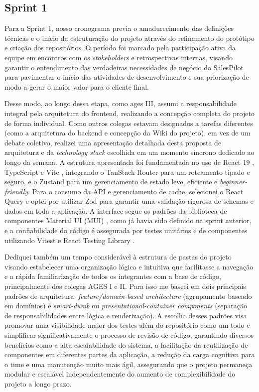 \subsection{Sprint 1}


Para a Sprint 1, nosso cronograma previa o amadurecimento das definições técnicas e o início da estruturação do projeto através do refinamento do protótipo e criação dos repositórios. O período foi marcado pela participação ativa da equipe em encontros com os \textit{stakeholders} e retrospectivas internas, visando garantir o entendimento das verdadeiras necessidades de negócio do SalesPilot para pavimentar o início das atividades de desenvolvimento e sua priorização de modo a gerar o maior valor para o cliente final.

Desse modo, ao longo dessa etapa, como \ac{ages} III, assumi a responsabilidade integral pela arquitetura do frontend, realizando a concepção completa do projeto de forma individual. Como outros colegas estavam designados a tarefas diferentes (como a arquitetura do backend e concepção da Wiki do projeto), em vez de um debate coletivo, realizei uma apresentação detalhada desta proposta de arquitetura e da \textit{technology stack} escolhida em um momento síncrono dedicado ao longo da semana. A estrutura apresentada foi fundamentada no uso de React 19 \cite{React}, TypeScript \cite{Typescript} e Vite \cite{Vite}, integrando o TanStack Router \cite{TanStackRouter} para um roteamento tipado e seguro, e o Zustand \cite{Zustand} para um gerenciamento de estado leve, eficiente e \textit{beginner-friendly}. Para o consumo da API e gerenciamento de cache, selecionei o React Query \cite{TanStackQuery} e optei por utilizar Zod \cite{Zod} para garantir uma validação rigorosa de schemas e dados em toda a aplicação. A interface segue os padrões da biblioteca de componentes Material UI (MUI) \cite{MUI}, como já havia sido definido na sprint anterior, e a confiabilidade do código é assegurada por testes unitários e de componentes utilizando Vitest \cite{Vitest} e React Testing Library \cite{ReactTestingLibrary}.

Dediquei também um tempo considerável à estrutura de pastas do projeto visando estabelecer uma organização lógica e intuitiva que facilitasse a navegação e a rápida familiarização de todos os integrantes com a base de código, principalmente dos colegas AGES I e II. Para isso me baseei em dois principais padrões de arquitetura: \textit{feature/domain-based architecture} \cite{FeatureBasedArchitecture} (agrupamento baseado em domínios) e \textit{smart-dumb} ou \textit{presentational-container components} \cite{ContainerPresentationalPattern} (separação de responsabilidades entre lógica e renderização). A escolha desses padrões visa promovar uma visibilidade maior dos testes além do repositório como um todo e simplificar significativamente o processo de revisão de código, garantindo diversos benefícios como a alta escalabilidade do sistema, a facilitação da reutilização de componentes em diferentes partes da aplicação, a redução da carga cognitiva para o time e uma manutenção muito mais ágil, assegurando que o projeto permaneça modular e escalável independentemente do aumento de complexibilidade do projeto a longo prazo.

